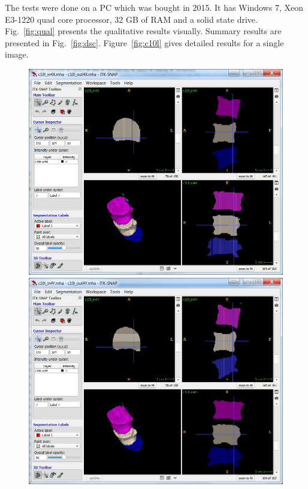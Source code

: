 \documentclass{InsightArticle}
\begin{document}
The tests were done on a PC which was bought in 2015. It has Windows 7,
Xeon E3-1220 quad core processor, 32 GB of RAM and a solid state drive.
Fig.~\ref{fig:qual} presents the qualitative results visually.
Summary results are presented in Fig.~\ref{fig:dsc}.
Figure~\ref{fig:c10l} gives detailed results for a single image.

\begin{figure}[!htb]
\center
\includegraphics[scale=0.42]{c10x.png}
\includegraphics[scale=0.42]{c10y.png}

\end{figure}
\end{document}
